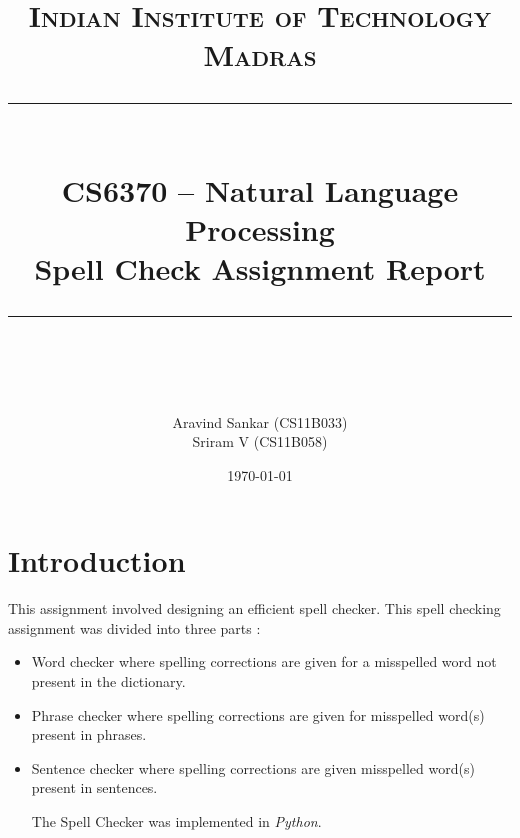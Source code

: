 \newcommand{\horrule}[1]{\rule{\linewidth}{#1}} %

\title{	
\normalfont \normalsize 
\textsc{Indian Institute of Technology Madras} \\ [25pt] %
\horrule{0.5pt} \\[0.4cm] %
\huge CS6370 -- Natural Language Processing \\ Spell Check Assignment Report \\ %
\horrule{2pt} \\[0.5cm] %
}
\author{\Large Aravind Sankar (CS11B033) \\ \Large Sriram V (CS11B058)} %

\date{\today} %



\maketitle

\section{Introduction}
This assignment involved designing an efficient spell checker. This spell checking assignment was divided into three parts : 
\begin{itemize}
\item Word checker where spelling corrections are given for a misspelled word not present in the dictionary.
\item Phrase checker where spelling corrections are given for misspelled word(s) present in phrases.
\item Sentence checker where spelling corrections are given misspelled word(s) present in sentences.

The Spell Checker was implemented in \textit{Python}.
\end{itemize}

